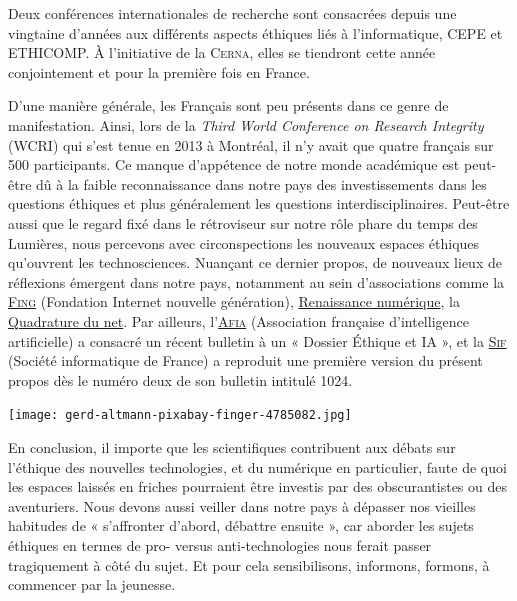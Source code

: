 Deux conférences internationales de recherche sont consacrées depuis une vingtaine d’années aux différents aspects éthiques liés à l’informatique, CEPE et ETHICOMP. À l’initiative de la \textsc{Cerna}, elles se tiendront cette année conjointement et pour la première fois en France.

D’une manière générale, les Français sont peu présents dans ce genre de manifestation. Ainsi, lors de la \textit{Third World Conference on Research Integrity} (WCRI) qui s’est tenue en 2013 à Montréal, il n’y avait que quatre français sur 500 participants. Ce manque d’appétence de notre monde académique est peut-être dû à la faible reconnaissance dans notre pays des investissements dans les questions éthiques et plus généralement les questions interdisciplinaires. Peut-être aussi que le regard fixé dans le rétroviseur sur notre rôle phare du temps des Lumières, nous percevons avec circonspections les nouveaux espaces éthiques qu’ouvrent les technosciences. Nuançant ce dernier propos, de nouveaux lieux de réflexions émergent dans notre pays, notamment au sein d’associations comme la \href{https://fing.org/}{\textsc{Fing}} (Fondation Internet nouvelle génération), \href{https://www.renaissancenumerique.org/}{Renaissance numérique}, la \href{https://www.laquadrature.net/}{Quadrature du net}. Par ailleurs, l’\href{https://afia.asso.fr/}{\textsc{Afia}} (Association française d’intelligence artificielle) a consacré un récent bulletin à un « Dossier Éthique et IA », et la \href{https://www.societe-informatique-de-france.fr/}{\textsc{Sif}} (Société informatique de France) a reproduit une première version du présent propos dès le numéro deux de son bulletin intitulé 1024.

\begin{jazzgraphic*}
%
\texttt{[image: gerd-altmann-pixabay-finger-4785082.jpg]}%
\end{jazzgraphic*}

En conclusion, il importe que les scientifiques contribuent aux débats sur l’éthique des nouvelles technologies, et du numérique en particulier, faute de quoi les espaces laissés en friches pourraient être investis par des obscurantistes ou des aventuriers. Nous devons aussi veiller dans notre pays à dépasser nos vieilles habitudes de « s’affronter d’abord, débattre ensuite », car aborder les sujets éthiques en termes de pro- versus anti-technologies nous ferait passer tragiquement à côté du sujet. Et pour cela sensibilisons, informons, formons, à commencer par la jeunesse.

